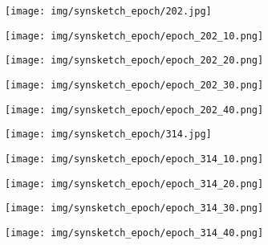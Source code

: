 \documentclass[10pt,twocolumn,letterpaper]{article}
\begin{document}
\newcommand{\ptsewidth}{0.18} 
\begin{figure}[tbp]
\captionsetup[subfigure]{labelformat=empty}
\begin{center}
  \begin{subfigure}[b]{\ptsewidth\linewidth}
  \texttt{[image: img/synsketch\_epoch/202.jpg]}
  \end{subfigure}
  \begin{subfigure}[b]{\ptsewidth\linewidth}
  \texttt{[image: img/synsketch\_epoch/epoch\_202\_10.png]}
  \end{subfigure}
\begin{subfigure}[b]{\ptsewidth\linewidth}
  \texttt{[image: img/synsketch\_epoch/epoch\_202\_20.png]}
  \end{subfigure}
  \begin{subfigure}[b]{\ptsewidth\linewidth}
  \texttt{[image: img/synsketch\_epoch/epoch\_202\_30.png]}
  \end{subfigure}
  \begin{subfigure}[b]{\ptsewidth\linewidth}
  \texttt{[image: img/synsketch\_epoch/epoch\_202\_40.png]}
  \end{subfigure}

\begin{subfigure}[b]{\ptsewidth\linewidth}
  \texttt{[image: img/synsketch\_epoch/314.jpg]}
  \end{subfigure}
  \begin{subfigure}[b]{\ptsewidth\linewidth}
  \texttt{[image: img/synsketch\_epoch/epoch\_314\_10.png]}
  \end{subfigure}
\begin{subfigure}[b]{\ptsewidth\linewidth}
  \texttt{[image: img/synsketch\_epoch/epoch\_314\_20.png]}
  \end{subfigure}
  \begin{subfigure}[b]{\ptsewidth\linewidth}
  \texttt{[image: img/synsketch\_epoch/epoch\_314\_30.png]}
  \end{subfigure}
  \begin{subfigure}[b]{\ptsewidth\linewidth}
  \texttt{[image: img/synsketch\_epoch/epoch\_314\_40.png]}
  \end{subfigure}
  

\end{center}
\end{figure}
\end{document}
